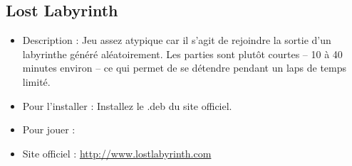\subsection{Lost Labyrinth}
\begin{itemize}
\begingroup
{}
\item Description : Jeu assez atypique car il s'agit de rejoindre la sortie d'un labyrinthe généré aléatoirement. Les parties sont plutôt courtes -- 10 à 40 minutes environ -- ce qui permet de se détendre pendant un laps de temps limité.{\par}
\item Pour l'installer : Installez le .deb du site officiel.{\par}
\item Pour jouer : 
\item Site officiel : \url{http://www.lostlabyrinth.com}{\par}
\endgroup
\end{itemize}
